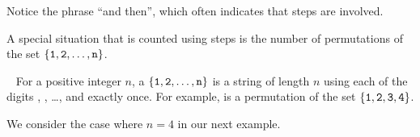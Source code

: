 Notice the phrase ``and then'', which often indicates that steps are involved. 

A special situation that is counted using steps is the number of permutations of the set $\{\texttt{1}, \texttt{2}, \ldots, \texttt{n}\}$. 

\begin{defn} 
\label{defn_permutation_of_set}
~
    For a positive integer $n$, a  
        $\{\texttt{1},\texttt{2},\ldots,\texttt{n}\}$ 
        is a string of length $n$ using each of the digits , , \ldots, and  exactly once. For example,  is a permutation of the set 
            $\{\texttt{1},\texttt{2},\texttt{3},\texttt{4}\}$. 
\end{defn}

We consider the case where $n=4$ in our next example.

